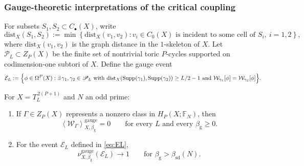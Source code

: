 \subsubsection{Gauge-theoretic interpretations of the critical coupling}

For subsets \(S_1,S_2\subset C_\bullet(X)\), write
\begin{equation}
	\mathrm{dist}_X(S_1,S_2)
	:=
	\min\left\{
	\mathrm{dist}_X(v_1,v_2):
	v_i\in C_0(X)\text{ is incident to some cell of }S_i,\ i=1,2
	\right\},
	\label{eq:dist-subsets}
\end{equation}
where \(\mathrm{dist}_X(v_1,v_2)\) is the graph distance in the \(1\)-skeleton of
\(X\). Let \(\mathscr P_L\subset Z_P(X)\) be the finite set of nontrivial toric
\(P\)-cycles supported on codimension-one subtori of \(X\). Define the gauge
event
\begin{equation}
	\mathcal E_L
	:=
	\Bigl\{
	\phi\in\Omega^P(X):
	\exists\,\gamma_1,\gamma_2\in\mathscr P_L
	\text{ with }
	\mathrm{dist}_X(\mathrm{Supp}(\gamma_1),\mathrm{Supp}(\gamma_2))\ge L/2-1
	\text{ and }
	\mathcal W_{\gamma_1}[\phi]=\mathcal W_{\gamma_2}[\phi]
	\Bigr\}.
	\label{eq:EL}
\end{equation}

\begin{prop}
	\label{prop:toric-gauge-consequences}
	For \(X=T_L^{\,2(P+1)}\) and \(N\) an odd prime:
	\begin{enumerate}
		\item
		If \(\Gamma\in Z_P(X)\) represents a nonzero class in
		\(H_P(X;\mathbb F_N)\), then
		\begin{equation}
			\left\langle \mathcal W_\Gamma \right\rangle^{\mathrm{gauge}}_{X,\beta_{\mathrm g}}
			=
			0
			\qquad
			\text{for every }L\text{ and every }\beta_{\mathrm g}\ge 0.
			\label{eq:single-toric-loop-zero}
		\end{equation}
		
		\item
		For the event \(\mathcal E_L\) defined in \eqref{eq:EL},
		\begin{equation}
			\nu^{\mathrm{gauge}}_{X,\beta_{\mathrm g}}(\mathcal E_L)\to 1
			\qquad
			\text{for }\beta_{\mathrm g}>\beta_{\mathrm{sd}}(N).
			\label{eq:EL-high}
		\end{equation}
	\end{enumerate}
\end{prop}

